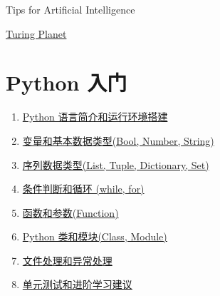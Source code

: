 \documentclass[11pt]{article}
\begin{document}
	\kaishu 
	\setcounter{section}{0}
	\begin{center}
		{\LARGE  Tips for Artificial Intelligence}
		
		
		{\large \href{https://www.youtube.com/@turingplanet4052}{Turing Planet}}
	\end{center}
\tableofcontents	
{\pagestyle{empty}\mbox{}\newpage\pagestyle{empty}}
\newpage 
\setcounter{page}{1}


\section{\kaishu Python 入门}

\begin{enumerate}
	\item \href{https://mp.weixin.qq.com/s/3k-Ov2r-v8TniyUqOBWyQw}{Python 语言简介和运行环境搭建} %
	\item \href{https://mp.weixin.qq.com/s/trfOXVDfRunc4ezQrd4p-Q}{变量和基本数据类型(Bool, Number, String)} %
	\item \href{https://mp.weixin.qq.com/s/HLCr11RGlDnUYlmhCibU-w}{序列数据类型(List, Tuple, Dictionary, Set)} %
	\item \href{https://mp.weixin.qq.com/s/QCXGFdUHSrieIeaS8rCdkA}{条件判断和循环 (while, for)} %
	\item \href{https://mp.weixin.qq.com/s/h3NseTBUcI3eMphy4dtsjg}{函数和参数(Function)} %
	\item \href{https://mp.weixin.qq.com/s/sxdPFlscGbGu7KIpgZy8lA}{Python 类和模块(Class, Module)} %
	\item \href{https://mp.weixin.qq.com/s/oJbC56Qi-REqFXYgg-VkQw}{文件处理和异常处理} %
	\item \href{https://mp.weixin.qq.com/s/z0VGfTgtEjMyvJzmYvLFEQ}{单元测试和进阶学习建议} %
\end{enumerate}
\end{document}

